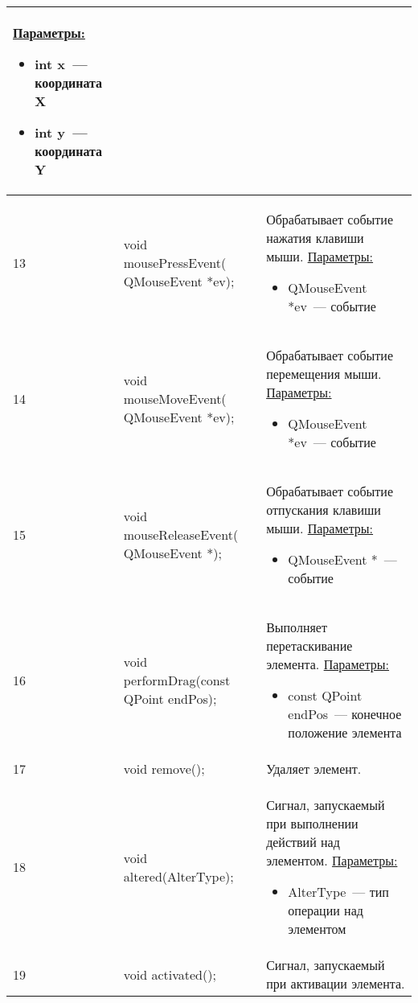 \begin{longtable}[h]{|p{}|p{}|p{}|}
    \uline{Параметры:}
    \begin{itemize}[nolistsep,label=,leftmargin=0cm]
      \item int x~--- координата X
      \item int y~--- координата Y
    \end{itemize}\\ \hline
  13 & void mousePressEvent( QMouseEvent *ev); & Обрабатывает событие нажатия клавиши мыши.\newline
    \uline{Параметры:}
    \begin{itemize}[nolistsep,label=,leftmargin=0cm]
      \item QMouseEvent *ev~--- событие
    \end{itemize}\\ \hline
  14 & void mouseMoveEvent( QMouseEvent *ev); & Обрабатывает событие перемещения мыши.\newline
    \uline{Параметры:}
    \begin{itemize}[nolistsep,label=,leftmargin=0cm]
      \item QMouseEvent *ev~--- событие
    \end{itemize}\\ \hline
  15 & void mouseReleaseEvent( QMouseEvent *); & Обрабатывает событие отпускания клавиши мыши.\newline
    \uline{Параметры:}
    \begin{itemize}[nolistsep,label=,leftmargin=0cm]
      \item QMouseEvent *~--- событие
    \end{itemize}\\ \hline
  16 & void performDrag(const QPoint endPos); & Выполняет перетаскивание элемента.\newline
    \uline{Параметры:}
    \begin{itemize}[nolistsep,label=,leftmargin=0cm]
      \item const QPoint endPos~--- конечное положение элемента
    \end{itemize}\\ \hline
  17 & void remove(); & Удаляет элемент.\\ \hline
  18 & void altered(AlterType); & Сигнал, запускаемый при выполнении действий над элементом.\newline
    \uline{Параметры:}
    \begin{itemize}[nolistsep,label=,leftmargin=0cm]
      \item AlterType~--- тип операции над элементом
    \end{itemize}\\ \hline
  19 & void activated(); & Сигнал, запускаемый при активации элемента.\\ \hline
\end{longtable}
\normalsize
\onehalfspacing


